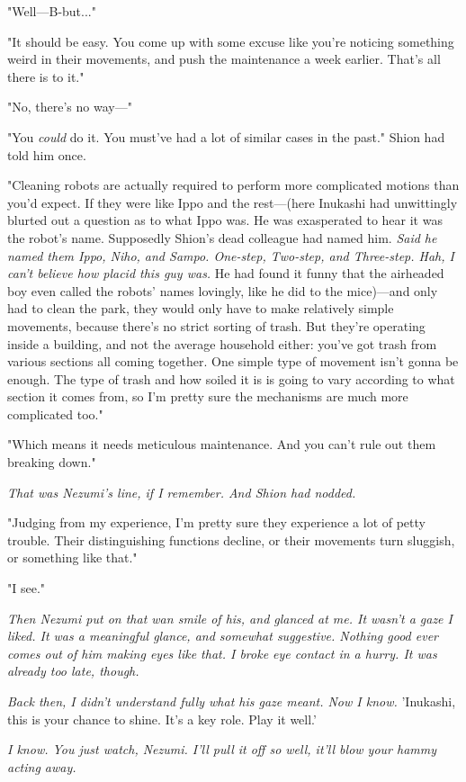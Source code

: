 "Well---B-but..."

"It should be easy. You come up with some excuse like you're noticing
something weird in their movements, and push the maintenance a week
earlier. That's all there is to it."

"No, there's no way---"

"You \emph{could} do it. You must've had a lot of similar cases in the past."
Shion had told him once.

"Cleaning robots are actually required to perform more complicated
motions than you'd expect. If they were like Ippo and the rest---(here
Inukashi had unwittingly blurted out a question as to what Ippo was. He
was exasperated to hear it was the robot's name. Supposedly Shion's dead
colleague had named him. \emph{Said he named them Ippo, Niho, and Sampo.
One-step, Two-step, and Three-step. Hah, I can't believe how placid this
guy was.} He had found it funny that the airheaded boy even called the
robots' names lovingly, like he did to the mice)---and only had to clean
the park, they would only have to make relatively simple movements,
because there's no strict sorting of trash. But they're operating inside
a building, and not the average household either: you've got trash from
various sections all coming together. One simple type of movement isn't
gonna be enough. The type of trash and how soiled it is is going to vary
according to what section it comes from, so I'm pretty sure the
mechanisms are much more complicated too."~

"Which means it needs meticulous maintenance. And you can't rule out
them breaking down."

\emph{That was Nezumi's line, if I remember. And Shion had nodded.}

"Judging from my experience, I'm pretty sure they experience a lot of
petty trouble. Their distinguishing functions decline, or their
movements turn sluggish, or something like that."

"I see."

\emph{Then Nezumi put on that wan smile of his, and glanced at me. It wasn't a
gaze I liked. It was a meaningful glance, and somewhat suggestive.
Nothing good ever comes out of him making eyes like that. I broke eye
contact in a hurry. It was already too late, though.}

\emph{Back then, I didn't understand fully what his gaze meant. Now I know.}
'Inukashi, this is your chance to shine. It's a key role. Play it well.'

\emph{I know. You just watch, Nezumi. I'll pull it off so well, it'll blow
your hammy acting away.}

